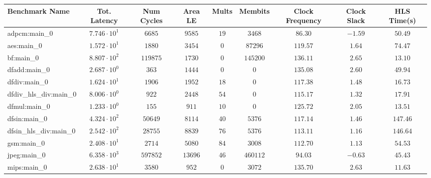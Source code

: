 \begin{tabular}{|l|c|c|c|c|c|c|c|c|}
\hline
Benchmark Name          & Tot. Latency           & Num Cycles & Area LE   & Mults   & Membits    & Clock Frequency & Clock Slack & HLS Time(s) \\
\hline
adpcm:main\_0           & $ 7.746 \cdot 10^{1} $ & $ 6685   $ & $ 9585  $ & $ 19  $ & $ 3468   $ & $ 86.30       $ & $ -1.59   $ & $ 50.49   $ \\
aes:main\_0             & $ 1.572 \cdot 10^{1} $ & $ 1880   $ & $ 3454  $ & $ 0   $ & $ 87296  $ & $ 119.57      $ & $ 1.64    $ & $ 74.47   $ \\
bf:main\_0              & $ 8.807 \cdot 10^{2} $ & $ 119875 $ & $ 1730  $ & $ 0   $ & $ 145200 $ & $ 136.11      $ & $ 2.65    $ & $ 13.10   $ \\
dfadd:main\_0           & $ 2.687 \cdot 10^{0} $ & $ 363    $ & $ 1444  $ & $ 0   $ & $ 0      $ & $ 135.08      $ & $ 2.60    $ & $ 49.94   $ \\
dfdiv:main\_0           & $ 1.624 \cdot 10^{1} $ & $ 1906   $ & $ 1952  $ & $ 18  $ & $ 0      $ & $ 117.38      $ & $ 1.48    $ & $ 16.73   $ \\
dfdiv\_hls\_div:main\_0 & $ 8.006 \cdot 10^{0} $ & $ 922    $ & $ 2448  $ & $ 54  $ & $ 0      $ & $ 115.17      $ & $ 1.32    $ & $ 17.91   $ \\
dfmul:main\_0           & $ 1.233 \cdot 10^{0} $ & $ 155    $ & $ 911   $ & $ 10  $ & $ 0      $ & $ 125.72      $ & $ 2.05    $ & $ 13.51   $ \\
dfsin:main\_0           & $ 4.324 \cdot 10^{2} $ & $ 50649  $ & $ 8114  $ & $ 40  $ & $ 5376   $ & $ 117.14      $ & $ 1.46    $ & $ 147.46  $ \\
dfsin\_hls\_div:main\_0 & $ 2.542 \cdot 10^{2} $ & $ 28755  $ & $ 8839  $ & $ 76  $ & $ 5376   $ & $ 113.11      $ & $ 1.16    $ & $ 146.64  $ \\
gsm:main\_0             & $ 2.408 \cdot 10^{1} $ & $ 2714   $ & $ 5080  $ & $ 84  $ & $ 3008   $ & $ 112.70      $ & $ 1.13    $ & $ 54.53   $ \\
jpeg:main\_0            & $ 6.358 \cdot 10^{3} $ & $ 597852 $ & $ 13696 $ & $ 46  $ & $ 460112 $ & $ 94.03       $ & $ -0.63   $ & $ 45.43   $ \\
mips:main\_0            & $ 2.638 \cdot 10^{1} $ & $ 3580   $ & $ 952   $ & $ 0   $ & $ 3072   $ & $ 135.70      $ & $ 2.63    $ & $ 11.63   $ \\

\end{tabular}

